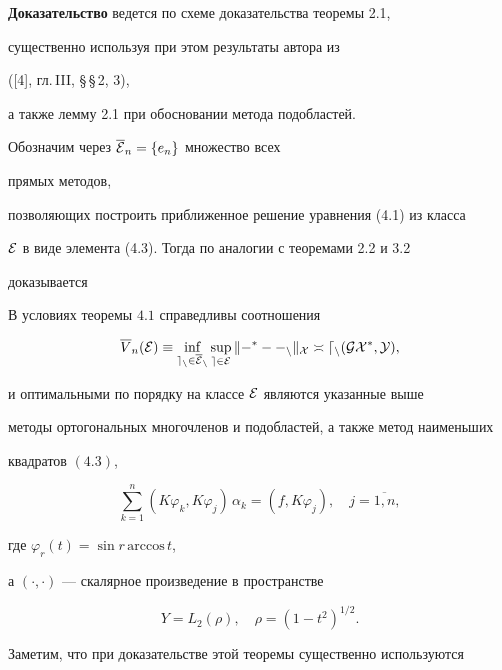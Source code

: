 {\bf Доказательство} ведется по схеме доказательства теоремы 2.1,


существенно используя при этом результаты автора из


([4], гл.\,III, \S\,\S\,2, 3),


а также лемму 2.1 при обосновании метода подобластей.





Обозначим через $\overline{\cal E}_n=\{ e_n\}$ множество всех


прямых методов,


позволяющих построить приближенное решение уравнения (4.1) из класса


$\cal E$ в виде элемента (4.3). Тогда по аналогии с теоремами 2.2 и 3.2


доказывается





\begin{thms}


В условиях теоремы $4.1$ справедливы соотношения


$$


\overline{V}_n(\cal E)\equiv \inf_{e_n\in \overline{\cal E}_n}


\sup_{e\in \cal E}\|\Gamma^* -\Gamma_n\|_X \asymp d_n(GX^*,Y),


$$


и оптимальными по порядку на классе $\cal E$ являются указанные выше


методы ортогональных многочленов и подобластей, а также метод наименьших


квадратов $(4.3)$,


$$


\sum_{k=1}^n(K\varphi_k,K\varphi_j)\, \alpha_k=(f,K\varphi_j),\quad


j=\overline{1,n},


$$


где $\varphi_r(t)=\sin{r\,\mathrm{arccos}\,t}$,


а $(\cdot ,\cdot )$ --- скалярное произведение в пространстве


$$


Y=L_2(\rho),\quad \rho=(1-t^2)^{1/2}.


$$


\end{thms}





Заметим, что при доказательстве этой теоремы существенно используются



